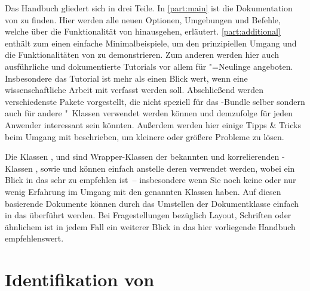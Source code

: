 Das Handbuch gliedert sich in drei Teile. In \autoref{part:main} ist die 
Dokumentation von \TUDScript zu finden. Hier werden alle neuen Optionen, 
Umgebungen und Befehle, welche über die Funktionalität von \KOMAScript 
hinausgehen, erläutert. \autoref{part:additional} enthält zum einen einfache 
Minimalbeispiele, um den prinzipiellen Umgang und die Funktionalitäten von 
\TUDScript zu demonstrieren. Zum anderen werden hier auch ausführliche und 
dokumentierte Tutorials vor allem für "=Neulinge angeboten. 
Insbesondere das Tutorial  ist mehr als einen Blick wert, 
wenn eine wissenschaftliche Arbeit mit  verfasst werden soll.
Abschließend werden verschiedenste Pakete vorgestellt, die nicht speziell für 
das \TUDScript-Bundle selber sondern auch für andere "~Klassen
verwendet werden können und demzufolge für jeden Anwender interessant sein 
könnten. Außerdem werden hier einige Tipps \& Tricks beim Umgang mit 
 beschrieben, um kleinere oder größere Probleme zu lösen.

Die Klassen ,  und  
sind Wrapper-Klassen der bekannten und korrelierenden \KOMAScript-Klassen 
,  sowie  und können einfach 
anstelle deren verwendet werden, wobei ein Blick in das \scrguide sehr zu 
empfehlen ist~-- insbesondere wenn Sie noch keine oder nur wenig Erfahrung im 
Umgang mit den genannten Klassen haben. Auf diesen basierende Dokumente können 
durch das Umstellen der Dokumentklasse einfach in das \TUDCD überführt werden. 
Bei Fragestellungen bezüglich Layout, Schriften oder ähnlichem ist in jedem 
Fall ein weiterer Blick in das hier vorliegende Handbuch empfehlenswert.



\section{Identifikation von \TUDScript}

